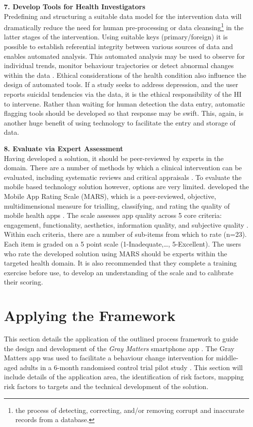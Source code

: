 \textbf{7. Develop Tools for Health Investigators} \\
Predefining and structuring a suitable data model for the intervention data will dramatically reduce the need for human pre-processing or data cleansing\footnote{the process of detecting, correcting, and/or removing corrupt and inaccurate records from a database.} in the latter stages of the intervention. Using suitable keys (primary/foreign) it is possible to establish referential integrity between various sources of data and enables automated analysis.
This automated analysis may be used to observe for individual trends, monitor behaviour trajectories or detect abnormal changes within the data \cite{Hartin2015-ICOST}.
Ethical considerations of the health condition also influence the design of automated tools. If a study seeks to address depression, and the user reports suicidal tendencies via the data, it is the ethical responsibility of the HI to intervene. Rather than waiting for human detection the data entry, automatic flagging tools should be developed so that response may be swift. This, again, is another huge benefit of using technology to facilitate the entry and storage of data.

\textbf{8. Evaluate via Expert Assessment}\\
Having developed a solution, it should be peer-reviewed by experts in the domain. There are a number of methods by which a clinical intervention can be evaluated, including systematic reviews and critical appraisals \cite{Sackett1997, Morrison1999}.
To evaluate the mobile based technology solution however, options are very limited. \citeauthor{Stoyanov2015} developed the Mobile App Rating Scale (MARS), which is a peer-reviewed, objective, multidimensional measure for trialling, classifying, and rating the quality of mobile health apps \cite{Stoyanov2015}. The scale assesses app quality across 5 core criteria: engagement, functionality, aesthetics, information quality, and subjective quality \cite{Stoyanov2015}. Within each criteria, there are a number of sub-items from which to rate (n=23). Each item is graded on a 5 point scale (1-Inadequate,\ldots, 5-Excellent).
The users who rate the developed solution using MARS should be experts within the targeted health domain. It is also recommended that they complete a training exercise before use, to develop an understanding of the scale and to calibrate their scoring.

\section{Applying the Framework}
This section details the application of the outlined process framework to guide the design and development of the \textit{Gray Matters} smartphone app \cite{Hartin2014-IWAAL}. The Gray Matters app was used to facilitate a behaviour change intervention for middle-aged adults in a 6-month randomised control trial pilot study \cite{Norton2015-TRCI}. This section will include details of the application area, the identification of risk factors, mapping risk factors to targets and the technical development of the solution.

